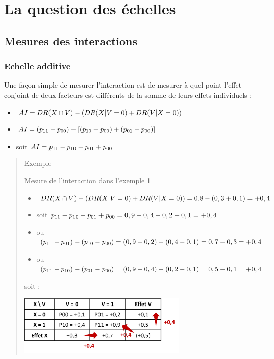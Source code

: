 \documentclass[
]{book}
\providecommand{\tightlist}{%
  \setlength{\itemsep}{0pt}\setlength{\parskip}{0pt}}
\begin{document}
\hypertarget{la-question-des-uxe9chelles}{%
\chapter{La question des échelles}\label{la-question-des-uxe9chelles}}

\hypertarget{mesures-des-interactions}{%
\section{Mesures des interactions}\label{mesures-des-interactions}}

\hypertarget{echelle-additive}{%
\subsection*{Echelle additive}\label{echelle-additive}}

Une façon simple de mesurer l'interaction est de mesurer à quel point l'effet conjoint de deux facteurs est différents de la somme de leurs effets individuels \citet{vanderweele_tutorial_2014} :

\begin{itemize}
\tightlist
\item
  \(\small AI = DR(X\cap V) - (DR(X|V=0) + DR(V|X=0))\)
\item
  \(\small AI = (p_{11} - p_{00}) - [(p_{10} - p_{00}) + (p_{01} - p_{00})]\)
\item
  soit \(\small AI =p_{11} - p_{10} - p_{01} + p_{00}\)
\end{itemize}

\begin{quote}
Exemple

Mesure de l'interaction dans l'exemple 1

\begin{itemize}
\tightlist
\item
  \(\small DR(X\cap V) - (DR(X|V=0) + DR(V|X=0)) = 0.8 - (0,3 + 0,1) = +0,4\)
\item
  soit \(\small p_{11} - p_{10} - p_{01} + p_{00} = 0,9 - 0,4 - 0,2 + 0,1 = +0,4\)
\item
  ou \(\small (p_{11} - p_{01}) - (p_{10} - p_{00}) = (0,9 - 0,2) - (0,4 - 0,1) = 0,7 - 0,3 = +0,4\)
\item
  ou \(\small (p_{11} - p_{10}) - (p_{01} - p_{00}) = (0,9 - 0,4) - (0,2 - 0,1) = 0,5 - 0,1 = +0,4\)
\end{itemize}

soit :

\includegraphics[width=0.65\textwidth,height=\textheight]{img/Image2.png}
\end{quote}
\end{document}
